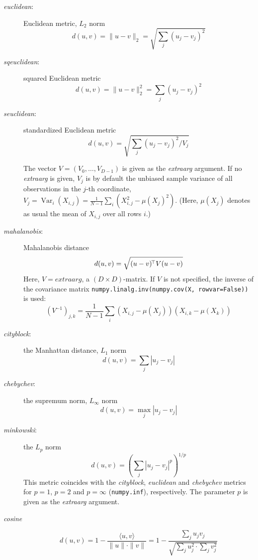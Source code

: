 \documentclass[fontsize=10pt,paper=letter,BCOR=-6mm,DIV=8]{scrartcl}
\makeatletter
\newcommand*\q{\textquotesingle}
\DeclareMathOperator\Var{Var}
\newenvironment{methods}{%
  \list{}{\labelwidth\z@
    \itemindent-\leftmargin
    \let\makelabel\methodslabel}%
}{%
  \endlist
}
\newcommand*{\methodslabel}[1]{%
  \hbox to \textwidth{\hspace{\labelsep}%
  \normalfont\bfseries\ttfamily
  #1\hskip-\labelsep\hfill}%
}
\makeatother
\begin{document}
\begin{methods}
\begin{description}
\item[\normalfont\textit{\q euclidean\q}:] Euclidean metric, $L_2$ norm
\[
 d(u,v) = \| u-v\|_2 = \sqrt{\sum_j (u_j-v_j)^2}
\]

\item[\normalfont\textit{\q sqeuclidean\q}:] squared Euclidean metric
\[
 d(u,v) = \| u-v\|^2_2 = \sum_j (u_j-v_j)^2
\]

\item[\normalfont\textit{\q seuclidean\q}:] standardized Euclidean metric
\[
 d(u,v) = \sqrt{\sum_j (u_j-v_j)^2 /V_j}
\]

The vector $V=(V_0,\ldots,V_{D-1})$ is given as the \textit{extraarg} argument. If no \textit{extraarg} is given, $V_j$ is by default the unbiased sample variance of all observations in the $j$-th coordinate, $V_j = \Var_i(X_{i,j})=\frac1{N-1}\sum_i(X_{i,j}^2-\mu(X_j)^2)$. (Here, $\mu(X_j)$ denotes as usual the mean of $X_{i,j}$ over all rows $i$.)

\item[\normalfont\textit{\q mahalanobis\q}:] Mahalanobis distance
\[
 d(u,v) = \sqrt{(u-v)^{\mkern-3mu\top}V (u-v)}
\]
Here, $V=\textit{extraarg}$, a $(D\times D)$-matrix. If $V$ is not specified, the inverse of the covariance matrix \texttt{numpy.linalg.inv(numpy.\allowbreak cov(\allowbreak X, rowvar=False))} is used:
\[
 (V^{-1})_{j,k} = \frac1{N-1} \sum_i (X_{i,j}-\mu(X_j))(X_{i,k}-\mu(X_k))
\]

\item[\normalfont\textit{\q cityblock\q}:] the Manhattan distance, $L_1$ norm
\[
 d(u,v) = \sum_j |u_j-v_j|
\]

\item[\normalfont\textit{\q chebychev\q}:] the supremum norm, $L_\infty$ norm
\[
 d(u,v) = \max_j |u_j-v_j|
\]

\item[\normalfont\textit{\q minkowski\q}:] the $L_p$ norm
\[
 d(u,v) = \left(\sum_j |u_j-v_j|^p\right)^{1/p}
\]
This metric coincides with the \textit{cityblock}, \textit{euclidean} and \textit{chebychev} metrics for $p=1$, $p=2$ and $p=\infty$ (\texttt{numpy.inf}), respectively. The parameter $p$ is given as the \textit{\q extraarg\q} argument.

\item[\normalfont\textit{\q cosine\q}]
\[
 d(u,v) = 1 - \frac{\langle u,v\rangle}{\|u\|\cdot\|v\|} = 1 - \frac{\sum_j u_jv_j}{\sqrt{\sum_j u_j^2\cdot \sum_j v_j^2}}
\]


\end{description}
\end{methods}
\end{document}
